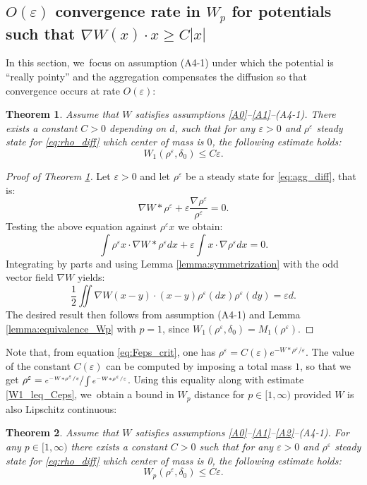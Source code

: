 \documentclass[11pt]{article}
\newcommand{\Subsection}{\subsection}
\numberwithin{equation}{section}
\def\eps{\varepsilon}
\theoremstyle{plain}
\newtheorem{theorem}{Theorem}[section]
\theoremstyle{definition}
\begin{document}
\Subsection{$O(\eps)$ convergence rate in $W_p$ for potentials such that $\nabla W(x) \cdot x \geq C |x|$}

In this section, we~focus on assumption (A4-1) under which the potential is ``really pointy'' and the aggregation compensates the diffusion so that convergence occurs at rate $O(\eps)$:
\begin{theorem}\label{thm:W1_leq_Ceps}
Assume that $W$ satisfies assumptions \eqref{A0}--\eqref{A1}--\textup{(A4-1)}. There exists a constant $C > 0$ depending on $d$, such that for any $\eps>0$ and $\rho^\eps$ steady state for \eqref{eq:rho_diff} which center of mass is $0$, the following estimate holds:
\begin{equation}\label{W1_leq_Ceps}
W_1(\rho^\eps, \delta_0) \leq C\eps.
\end{equation}
\end{theorem}
\begin{proof}[Proof of Theorem \ref{thm:W1_leq_Ceps}]
Let $\eps>0$ and let $\rho^\eps$ be a steady state for \eqref{eq:agg_diff}, that is:
\begin{equation}\label{eq:Feps_crit}
\nabla W * \rho^\eps + \eps \frac{\nabla \rho^\eps}{\rho^\eps} = 0.
\end{equation}
Testing the above equation against $\rho^\eps x$ we obtain:
\[
\int \rho^\eps x \cdot \nabla W * \rho^\eps dx + \eps \int x \cdot \nabla \rho^\eps dx = 0.
\]
Integrating by parts and using Lemma \ref{lemma:symmetrization} with the odd vector field $\nabla W$ yields:
\[
\frac{1}{2} \iint \nabla W(x-y) \cdot (x-y) \rho^\eps(dx) \rho^\eps(dy) = \eps d.
\]
The desired result then follows from assumption (A4-1) and Lemma \ref{lemma:equivalence_Wp} with $p=1$, since $W_1(\rho^\eps, \delta_0) = M_1(\rho^\eps)$.
\end{proof}
Note that, from equation \eqref{eq:Feps_crit}, one has $\rho^\eps =C(\eps)e^{-W * \rho^\eps / \eps}$. The value of the constant $C(\eps)$ can be computed by imposing a total mass $1$, so that we get $\rho^\eps=\sfrac{e^{-W * \rho^\eps / \eps}}{\int e^{-W * \rho^\eps / \eps}}$. Using this equality along with estimate \eqref{W1_leq_Ceps}, we~obtain a bound in $W_p$ distance for $p \in [1, \infty)$ provided $W$ is also Lipschitz continuous:
\begin{theorem}
Assume that $W$ satisfies assumptions \eqref{A0}--\eqref{A1}--\eqref{A2}--\textup{(A4-1)}. For any $p \in [1, \infty)$ there exists a constant $C > 0$ such that for any $\eps>0$ and $\rho^\eps$ steady state for \eqref{eq:rho_diff} which center of mass is 0, the following estimate holds:
\begin{equation*}%
W_p(\rho^\eps, \delta_0) \leq C\eps.
\end{equation*}
\end{theorem}
\end{document}
